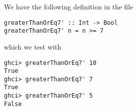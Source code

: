 
We have the following definition in the file 
\scriptsize\begin{verbatim}
greaterThanOrEq7' :: Int -> Bool
greaterThanOrEq7' n = n >= 7
\end{verbatim}\normalsize
which we test with
\scriptsize\begin{verbatim}
ghci> greaterThanOrEq7' 10
True
ghci> greaterThanOrEq7' 7
True
ghci> greaterThanOrEq7' 5
False
\end{verbatim}\normalsize
